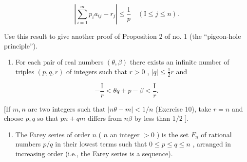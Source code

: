 \[
\left| \sum_ {i = 1} ^ {m} p _ {i} a _ {i j} - r _ {j} \right| \leqslant \frac {\mathrm{I}}{p} \quad (\mathrm{I} \leqslant j \leqslant n).
\]

Use this result to give another proof of Proposition 2 of no. 1 (the ``pigeon-hole principle'').

\begin{enumerate}
\def\labelenumi{\arabic{enumi})}
\setcounter{enumi}{11}
\tightlist
\item
  For each pair of real numbers \((\theta, \beta)\) there exists an infinite number of triples \((p, q, r)\) of integers such that \(r > 0\) , \(|q| \leqslant \frac{1}{2} r\) and
\end{enumerate}

\[
- \frac {\mathrm{I}}{r} <   \theta q + p - \beta <   \frac {\mathrm{I}}{r}.
\]

{[}If \(m, n\) are two integers such that \(|n\theta - m| < 1/n\) (Exercise 10), take \(r = n\) and choose \(p, q\) so that \(pn + qm\) differs from \(n\beta\) by less than \(1/2\) {]}.

\begin{enumerate}
\def\labelenumi{\arabic{enumi})}
\setcounter{enumi}{12}
\tightlist
\item
  The Farey series of order \(n\) ( \(n\) an integer \(>0\) ) is the set \(F_n\) of rational numbers \(p/q\) in their lowest terms such that \(0 \leqslant p \leqslant q \leqslant n\) , arranged in increasing order (i.e., the Farey series is a sequence).
\end{enumerate}


